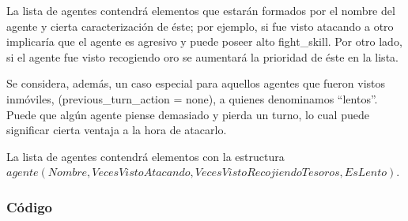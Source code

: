 \documentclass[a4paper,10pt,spanish]{article}
\begin{document}
	La lista de agentes contendr\'a elementos que estar\'an formados por el nombre del agente y cierta caracterizaci\'on de \'este; por ejemplo, si fue visto atacando a otro implicar\'ia que el agente es agresivo y puede poseer alto fight\_skill. Por otro lado, si el agente fue visto recogiendo oro se aumentar\'a la prioridad de \'este en la lista. 
	
	Se considera, adem\'as, un caso especial para aquellos agentes que fueron vistos inm\'oviles, (previous\_turn\_action = none), a quienes denominamos ``lentos''. Puede que alg\'un agente piense demasiado y pierda un turno, lo cual puede significar cierta ventaja a la hora de atacarlo.
	
	La lista de agentes contendr\'a elementos con la estructura \\
	$agente(Nombre, VecesVistoAtacando, VecesVistoRecojiendoTesoros, EsLento)$.
	
% 	
	
	\subsubsection{C\'odigo}
	
\end{document}
